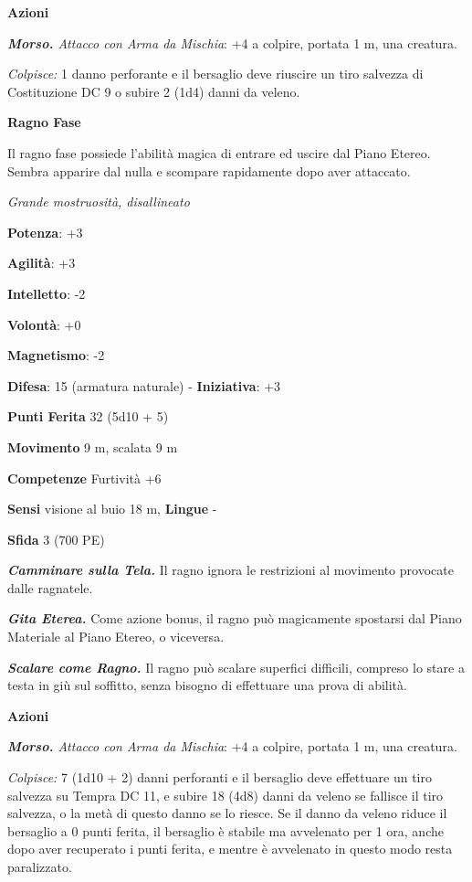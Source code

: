 \begin{multicols}{2}
\smallskip\textbf{Azioni}

\emph{\textbf{Morso.} Attacco con Arma da Mischia}: +4 a colpire,
portata 1 m, una creatura.

\emph{Colpisce:} 1 danno perforante e il bersaglio deve riuscire un tiro
salvezza di Costituzione DC 9 o subire 2 (1d4) danni da veleno.



\textbf{Ragno Fase}

Il ragno fase possiede l'abilità magica di entrare ed uscire dal Piano
Etereo. Sembra apparire dal nulla e scompare rapidamente dopo aver
attaccato.

\emph{Grande mostruosità, disallineato}

\textbf{Potenza}: +3

\textbf{Agilità}: +3

\textbf{Intelletto}: -2

\textbf{Volontà}: +0

\textbf{Magnetismo}: -2

\textbf{Difesa}: 15 (armatura naturale) - \textbf{Iniziativa}: +3

\textbf{Punti Ferita} 32 (5d10 + 5)

\textbf{Movimento} 9 m, scalata 9 m

\textbf{Competenze} Furtività +6

\textbf{Sensi} visione al buio 18 m, 
\textbf{Lingue} -

\textbf{Sfida} 3 (700 PE)\smallskip

\emph{\textbf{Camminare sulla Tela.}} Il ragno ignora le restrizioni al
movimento provocate dalle ragnatele.

\emph{\textbf{Gita Eterea.}} Come azione bonus, il ragno può magicamente
spostarsi dal Piano Materiale al Piano Etereo, o viceversa.

\emph{\textbf{Scalare come Ragno.}} Il ragno può scalare superfici
difficili, compreso lo stare a testa in giù sul soffitto, senza bisogno
di effettuare una prova di abilità.

\smallskip\textbf{Azioni}

\emph{\textbf{Morso.} Attacco con Arma da Mischia}: +4 a colpire,
portata 1 m, una creatura.

\emph{Colpisce:} 7 (1d10 + 2) danni perforanti e il bersaglio deve
effettuare un tiro salvezza su Tempra DC 11, e subire 18 (4d8)
danni da veleno se fallisce il tiro salvezza, o la metà di questo danno
se lo riesce. Se il danno da veleno riduce il bersaglio a 0 punti
ferita, il bersaglio è stabile ma avvelenato per 1 ora, anche dopo aver
recuperato i punti ferita, e mentre è avvelenato in questo modo resta
paralizzato.


\end{multicols}
